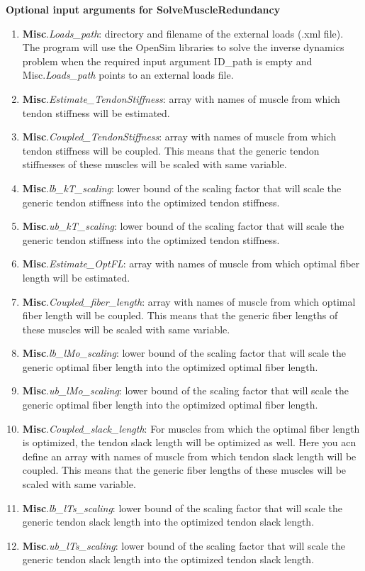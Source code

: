 \documentclass[a4paper,oneside,11pt]{article}
\begin{document}
\textbf{Optional input arguments for SolveMuscleRedundancy}
\begin{enumerate}
	\item \textbf{Misc}.\textit{Loads_path}: directory and filename of the external loads (.xml file). The program will use the OpenSim libraries to solve the inverse dynamics problem when the required input argument ID_path is empty and Misc.\textit{Loads_path} points to an external loads file.
	
	\item \textbf{Misc}.\textit{Estimate_TendonStiffness}: array with names of muscle from which tendon stiffness will be estimated.
	\item \textbf{Misc}.\textit{Coupled_TendonStiffness}: array with names of muscle from which tendon stiffness will be coupled. This means that the generic tendon stiffnesses of these muscles will be scaled with same variable.
	\item \textbf{Misc}.\textit{lb_kT_scaling}: lower bound of the scaling factor that will scale the generic tendon stiffness into the optimized tendon stiffness.
	\item \textbf{Misc}.\textit{ub_kT_scaling}: lower bound of the scaling factor that will scale the generic tendon stiffness into the optimized tendon stiffness.	
	
	\item \textbf{Misc}.\textit{Estimate_OptFL}: array with names of muscle from which optimal fiber length will be estimated.
	\item \textbf{Misc}.\textit{Coupled_fiber_length}: array with names of muscle from which optimal fiber length will be coupled. This means that the generic fiber lengths of these muscles will be scaled with same variable.
	\item \textbf{Misc}.\textit{lb_lMo_scaling}: lower bound of the scaling factor that will scale the generic optimal fiber length into the optimized optimal fiber length.
	\item \textbf{Misc}.\textit{ub_lMo_scaling}: lower bound of the scaling factor that will scale the generic optimal fiber length into the optimized optimal fiber length.		

	\item \textbf{Misc}.\textit{Coupled_slack_length}: For muscles from which the optimal fiber length is optimized, the tendon slack length will be optimized as well. Here you acn define an array with names of muscle from which tendon slack length will be coupled. This means that the generic fiber lengths of these muscles will be scaled with same variable.
	\item \textbf{Misc}.\textit{lb_lTs_scaling}: lower bound of the scaling factor that will scale the generic tendon slack length into the optimized tendon slack length.
	\item \textbf{Misc}.\textit{ub_lTs_scaling}: lower bound of the scaling factor that will scale the generic tendon slack length into the optimized tendon slack length.
	

\end{enumerate}
\end{document}
